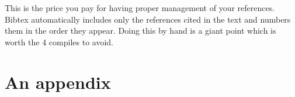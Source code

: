 \documentclass[11pt]{article}
\numberwithin{equation}{section}
\begin{document}
This is the price you pay for having proper management of your references.  Bibtex automatically includes only the references cited in the text and numbers them in the order they appear.  Doing this by hand is a giant point which is worth the 4 compiles to avoid.
\appendix
\section{An appendix}


\newpage
{}

%

\end{document}
